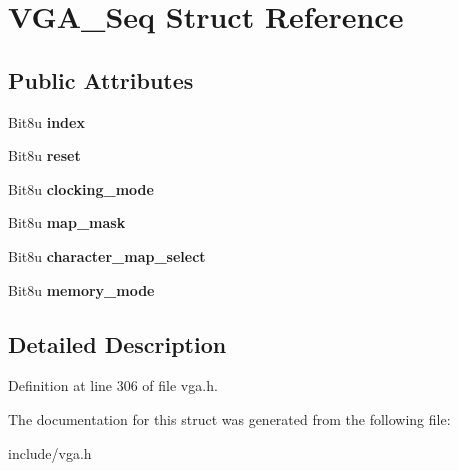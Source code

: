 \hypertarget{structVGA__Seq}{\section{V\-G\-A\-\_\-\-Seq Struct Reference}
\label{structVGA__Seq}
}
\subsection*{Public Attributes}
\begin{DoxyCompactItemize}
\item 
\hypertarget{structVGA__Seq_a00643c92e5873dcf83d17a3135b2d693}{Bit8u {\bfseries index}}\label{structVGA__Seq_a00643c92e5873dcf83d17a3135b2d693}

\item 
\hypertarget{structVGA__Seq_a3425fe4beaea31df04abd4a6b4dc34ce}{Bit8u {\bfseries reset}}\label{structVGA__Seq_a3425fe4beaea31df04abd4a6b4dc34ce}

\item 
\hypertarget{structVGA__Seq_a86024bda4c152b6e0bee83581155233e}{Bit8u {\bfseries clocking\-\_\-mode}}\label{structVGA__Seq_a86024bda4c152b6e0bee83581155233e}

\item 
\hypertarget{structVGA__Seq_a318a641c4a0ca18dd7de0de41e475bdc}{Bit8u {\bfseries map\-\_\-mask}}\label{structVGA__Seq_a318a641c4a0ca18dd7de0de41e475bdc}

\item 
\hypertarget{structVGA__Seq_a259ad5c028390b8e3f2247913c493044}{Bit8u {\bfseries character\-\_\-map\-\_\-select}}\label{structVGA__Seq_a259ad5c028390b8e3f2247913c493044}

\item 
\hypertarget{structVGA__Seq_a73f957b3431c728ff5908dfb58ed1e75}{Bit8u {\bfseries memory\-\_\-mode}}\label{structVGA__Seq_a73f957b3431c728ff5908dfb58ed1e75}

\end{DoxyCompactItemize}


\subsection{Detailed Description}


Definition at line 306 of file vga.\-h.



The documentation for this struct was generated from the following file\-:\begin{DoxyCompactItemize}
\item 
include/vga.\-h\end{DoxyCompactItemize}
